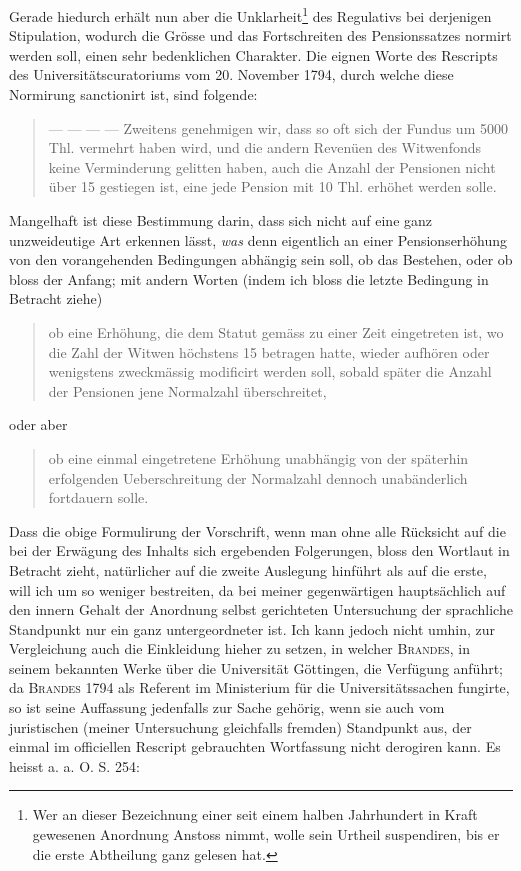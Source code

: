 \par{}
Gerade hiedurch erhält nun aber die Unklarheit\footnote{Wer an dieser Bezeichnung einer seit einem halben Jahrhundert in Kraft gewesenen Anordnung Anstoss nimmt, wolle sein Urtheil suspendiren, bis er die erste Abtheilung ganz gelesen hat.} des Regulativs bei derjenigen Stipulation, wodurch die Grösse und das Fortschreiten des Pensionssatzes normirt werden soll, einen sehr bedenklichen Charakter. Die eignen Worte des Rescripts des Universitätscuratoriums vom 20. November 1794, durch welche diese Normirung sanctionirt ist, sind folgende:
\begin{quote}
— — — — Zweitens genehmigen wir, dass so oft sich der Fundus um 5000 Thl. vermehrt haben wird, und die andern Revenüen des Witwenfonds keine Verminderung gelitten haben, auch die Anzahl der Pensionen nicht über 15 gestiegen ist, eine jede Pension mit 10 Thl. erhöhet werden solle.
\end{quote}
\noindent\hspace*{\parindent}Mangelhaft ist diese Bestimmung darin, dass sich nicht auf eine ganz unzweideutige Art erkennen lässt, \textit{was} denn eigentlich an einer Pensionserhöhung von den vorangehenden Bedingungen abhängig sein soll, ob das Bestehen, oder ob bloss der Anfang; mit andern Worten (indem ich bloss die letzte Bedingung in Betracht ziehe)
\begin{quote}
ob eine Erhöhung, die dem Statut gemäss zu einer Zeit eingetreten ist, wo die Zahl der Witwen höchstens 15 betragen hatte, wieder aufhören oder wenigstens zweckmässig modificirt werden soll, sobald später die Anzahl der Pensionen jene Normalzahl überschreitet,
\end{quote}
oder aber
\begin{quote}
ob eine einmal eingetretene Erhöhung unabhängig von der späterhin erfolgenden Ueberschreitung der Normalzahl dennoch unabänderlich fortdauern solle.
\end{quote}
\noindent\hspace*{\parindent}Dass die obige Formulirung der Vorschrift, wenn man ohne alle Rücksicht auf die bei der Erwägung des Inhalts sich ergebenden Folgerungen, bloss den Wortlaut in Betracht zieht, natürlicher auf die zweite Auslegung hinführt als auf die erste, will ich um so weniger bestreiten, da bei meiner gegenwärtigen hauptsächlich auf den innern Gehalt der Anordnung selbst gerichteten Untersuchung der sprachliche Standpunkt nur ein ganz untergeordneter ist. Ich kann jedoch nicht umhin, zur Vergleichung auch die Einkleidung hieher zu setzen, in welcher \textsc{Brandes}, in seinem bekannten Werke über die Universität Göttingen, die Verfügung anführt; da \textsc{Brandes} 1794 als Referent im Ministerium für die Universitätssachen fungirte, so ist seine Auffassung jedenfalls zur Sache gehörig, wenn sie auch vom juristischen (meiner Untersuchung gleichfalls fremden) Standpunkt aus, der einmal im officiellen Rescript gebrauchten Wortfassung nicht derogiren kann. Es heisst a. a. O. S. 254:
